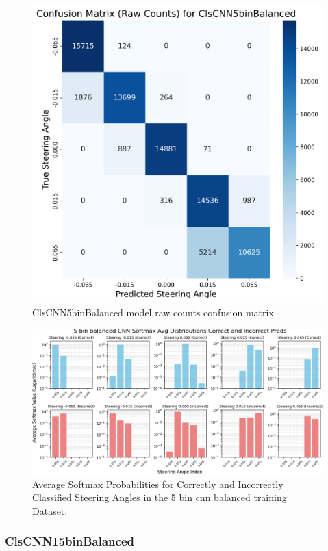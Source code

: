 \begin{figure}[H]
\centering
\includegraphics[width=0.65\linewidth]{Figures/Results/cm_raw_ClsCNN5binBalanced.png}
\caption{ClsCNN5binBalanced model raw counts confusion matrix}
\label{fig:cm_raw_ClsCNN5binBalanced}
\end{figure}

\begin{figure}[H]
    \centering
    \includegraphics[width=1\linewidth]{Figures/Results/5_bins_cnn_softmax_dist_plot_balanced.png}
    \caption{Average Softmax Probabilities for Correctly and Incorrectly Classified Steering Angles in the 5 bin cnn balanced training Dataset.}
    \label{fig:5_bins_cnn_softmax_dist_balanced}
\end{figure}


\subsubsection{ClsCNN15binBalanced}

